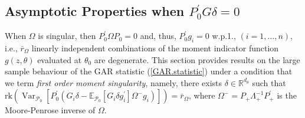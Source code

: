 \documentclass[hidelinks, 11 pt, a4paper, pdflatex]{article}
\DeclareMathOperator{\Var}{Var}
\begin{document}
{%

  \subsection{Asymptotic Properties when $P_0^{\prime}G \delta = 0$}

   When $\Omega$ is singular, then $P_{0}^{\prime}\Omega P_{0} = 0$ and, thus, $P_{0}^{\prime}g_{i} = 0$ w.p.1., $(i=1,\ldots,n)$, i.e., $\bar{r}_{\Omega}$ linearly independent combinations of the moment indicator function $g(z,\theta)$ evaluated at $\theta_{0}$ are degenerate. This section provides results on the large sample behaviour of the GAR statistic (\ref{GAR.statistic}) under a condition that we term \textit{first order moment singularity}, namely, there exists $\delta \in \mathbb{R}^{d_\theta}$ such that $\mathrm{rk}(\Var_{\mathcal{P}_{0}}[P_{0}^{\prime}(G_i\delta - \mathbb{E}_{\mathcal{P}_0}[G_i \delta g_i^{\prime}] \Omega^{-} g_i)]) = \bar{r}_{\Omega}$, where $\Omega^{-} = P_{+}\Lambda_+^{-1}P_+^{\prime}$ is the Moore-Penrose inverse of $\Omega$.

}
\end{document}
